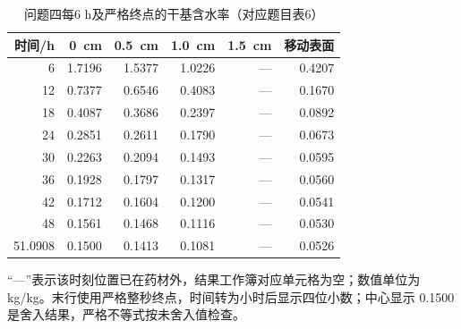 \begin{table}[htbp]
\centering\small
\caption{问题四每6 h及严格终点的干基含水率（对应题目表6）}\label{tab:paper6}
\begin{tabular}{rrrrrr}
\toprule
时间/h & 0~cm & 0.5~cm & 1.0~cm & 1.5~cm & 移动表面 \\
\midrule
6 & 1.7196 & 1.5377 & 1.0226 & --- & 0.4207 \\
12 & 0.7377 & 0.6546 & 0.4083 & --- & 0.1670 \\
18 & 0.4087 & 0.3686 & 0.2397 & --- & 0.0892 \\
24 & 0.2851 & 0.2611 & 0.1790 & --- & 0.0673 \\
30 & 0.2263 & 0.2094 & 0.1493 & --- & 0.0595 \\
36 & 0.1928 & 0.1797 & 0.1317 & --- & 0.0560 \\
42 & 0.1712 & 0.1604 & 0.1200 & --- & 0.0541 \\
48 & 0.1561 & 0.1468 & 0.1116 & --- & 0.0530 \\
51.0908 & 0.1500 & 0.1413 & 0.1081 & --- & 0.0526 \\
\bottomrule
\end{tabular}
\par\smallskip\begin{minipage}{0.93\linewidth}\footnotesize “---”表示该时刻位置已在药材外，结果工作簿对应单元格为空；数值单位为 kg/kg。末行使用严格整秒终点，时间转为小时后显示四位小数；中心显示 0.1500 是舍入结果，严格不等式按未舍入值检查。\end{minipage}
\end{table}
